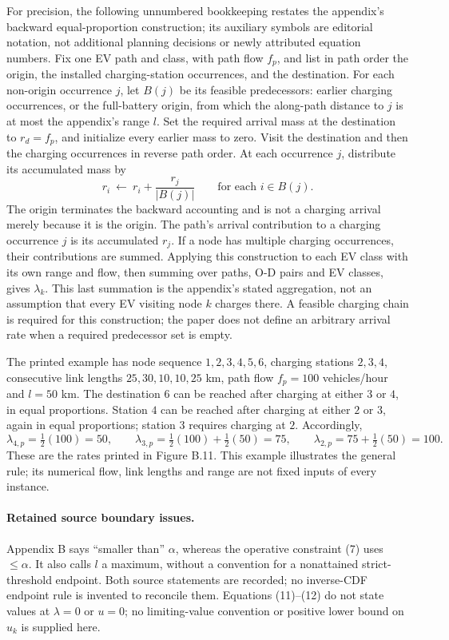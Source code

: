 \documentclass{article}
\begin{document}
For precision, the following unnumbered bookkeeping restates the appendix's backward equal-proportion construction; its auxiliary symbols are editorial notation, not additional planning decisions or newly attributed equation numbers. Fix one EV path and class, with path flow $f_p$, and list in path order the origin, the installed charging-station occurrences, and the destination. For each non-origin occurrence $j$, let $B(j)$ be its feasible predecessors: earlier charging occurrences, or the full-battery origin, from which the along-path distance to $j$ is at most the appendix's range $l$. Set the required arrival mass at the destination to $r_d=f_p$, and initialize every earlier mass to zero. Visit the destination and then the charging occurrences in reverse path order. At each occurrence $j$, distribute its accumulated mass by
\[
 r_i\ \leftarrow\ r_i+\frac{r_j}{|B(j)|}
 \qquad \text{for each }i\in B(j).
\]
The origin terminates the backward accounting and is not a charging arrival merely because it is the origin. The path's arrival contribution to a charging occurrence $j$ is its accumulated $r_j$. If a node has multiple charging occurrences, their contributions are summed. Applying this construction to each EV class with its own range and flow, then summing over paths, O-D pairs and EV classes, gives $\lambda_k$. This last summation is the appendix's stated aggregation, not an assumption that every EV visiting node $k$ charges there. A feasible charging chain is required for this construction; the paper does not define an arbitrary arrival rate when a required predecessor set is empty.

The printed example has node sequence $1,2,3,4,5,6$, charging stations $2,3,4$, consecutive link lengths $25,30,10,10,25$ km, path flow $f_p=100$ vehicles/hour and $l=50$ km. The destination $6$ can be reached after charging at either $3$ or $4$, in equal proportions. Station $4$ can be reached after charging at either $2$ or $3$, again in equal proportions; station $3$ requires charging at $2$. Accordingly,
\[
\lambda_{4,p}=\tfrac12(100)=50,\qquad
\lambda_{3,p}=\tfrac12(100)+\tfrac12(50)=75,\qquad
\lambda_{2,p}=75+\tfrac12(50)=100.
\]
These are the rates printed in Figure B.11. This example illustrates the general rule; its numerical flow, link lengths and range are not fixed inputs of every instance.

\paragraph{Retained source boundary issues.}
Appendix B says ``smaller than'' $\alpha$, whereas the operative constraint (7) uses $\leq\alpha$. It also calls $l$ a maximum, without a convention for a nonattained strict-threshold endpoint. Both source statements are recorded; no inverse-CDF endpoint rule is invented to reconcile them. Equations (11)--(12) do not state values at $\lambda=0$ or $u=0$; no limiting-value convention or positive lower bound on $u_k$ is supplied here.
\end{document}

